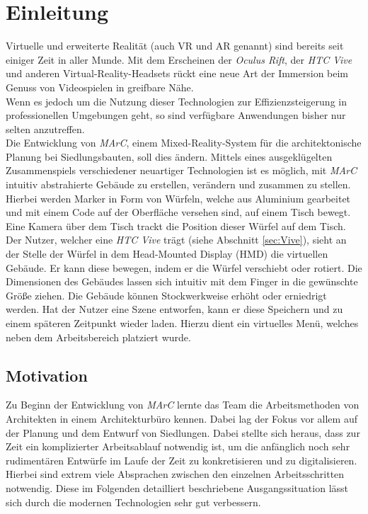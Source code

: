 \section{Einleitung}\label{sec:Einleitung}
Virtuelle und erweiterte Realität (auch \glqq VR\grqq{} und \glqq AR\grqq{} genannt) sind bereits seit einiger Zeit in aller Munde. Mit dem Erscheinen der \textit{Oculus Rift}, der \textit{HTC Vive} und anderen Virtual-Reality-Headsets rückt eine neue Art der Immersion beim Genuss von Videospielen in greifbare Nähe.\\ 
Wenn es jedoch um die Nutzung dieser Technologien zur Effizienzsteigerung in professionellen Umgebungen geht, so sind verfügbare Anwendungen bisher nur selten anzutreffen.\\
Die Entwicklung von \textit{MArC}, einem Mixed-Reality-System für die architektonische Planung bei Siedlungsbauten, soll dies ändern. Mittels eines ausgeklügelten Zusammenspiels verschiedener neuartiger Technologien ist es möglich, mit \textit{MArC} intuitiv abstrahierte Gebäude zu erstellen, verändern und zusammen zu stellen. \\
Hierbei werden Marker in Form von Würfeln, welche aus Aluminium gearbeitet und mit einem Code auf der Oberfläche versehen sind, auf einem Tisch bewegt. Eine Kamera über dem Tisch trackt die Position dieser Würfel auf dem Tisch. Der Nutzer, welcher eine \textit{HTC Vive} trägt (siehe Abschnitt \ref{sec:Vive}), sieht an der Stelle der Würfel in dem Head-Mounted Display (HMD) die virtuellen Gebäude. Er kann diese bewegen, indem er die Würfel verschiebt oder rotiert. Die Dimensionen des Gebäudes lassen sich intuitiv mit dem Finger in die gewünschte Größe ziehen. Die Gebäude können Stockwerkweise erhöht oder erniedrigt werden. Hat der Nutzer eine Szene entworfen, kann er diese Speichern und zu einem späteren Zeitpunkt wieder laden. Hierzu dient ein virtuelles Menü, welches neben dem Arbeitsbereich platziert wurde.


\subsection{Motivation}\label{sec:Motivation}
Zu Beginn der Entwicklung von \textit{MArC} lernte das Team die Arbeitsmethoden von Architekten in einem Architekturbüro kennen. Dabei lag der Fokus vor allem auf der Planung und dem Entwurf von Siedlungen. Dabei stellte sich heraus, dass zur Zeit ein komplizierter Arbeitsablauf notwendig ist, um die anfänglich noch sehr rudimentären Entwürfe im Laufe der Zeit zu konkretisieren und zu digitalisieren. Hierbei sind extrem viele Absprachen zwischen den einzelnen Arbeitsschritten notwendig. Diese im Folgenden detailliert beschriebene Ausgangssituation lässt sich durch die modernen Technologien sehr gut verbessern.



